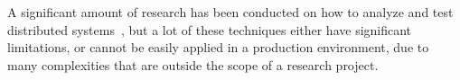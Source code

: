 A significant amount of research has been conducted on how to analyze and test distributed systems~\cite{lamport1994temporal, schuppan2004efficient, killian2007life, gupta2008diecast, yang2009modist}, but a lot of these techniques either have significant limitations, or cannot be easily applied in a production environment, due to many complexities that are outside the scope of a research project.
